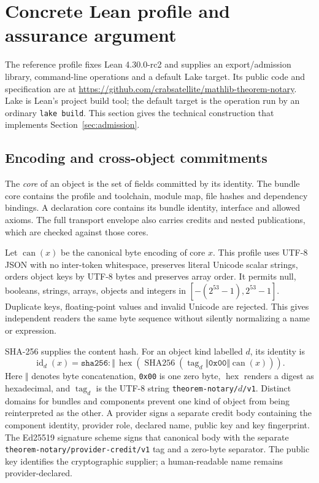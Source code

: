 \documentclass[11pt]{article}
\begin{document}
\section{Concrete Lean profile and assurance argument}
\label{sec:lean}

The reference profile fixes Lean 4.30.0-rc2 and supplies an export/admission
library, command-line operations and a default Lake target. Its public code and
specification are at \url{https://github.com/crabsatellite/mathlib-theorem-notary}.
Lake is Lean's
project build tool; the default target is the operation run by an ordinary
\texttt{lake build}. This section gives
the technical construction that implements Section~\ref{sec:admission}.

\subsection{Encoding and cross-object commitments}

The \emph{core} of an object is the set of fields committed by its identity.
The bundle core contains the profile and toolchain, module map, file hashes
and dependency bindings. A declaration core contains its bundle identity,
interface and allowed axioms. The full transport envelope also carries credits
and nested publications, which are checked against those cores.

Let $\operatorname{can}(x)$ be the canonical byte encoding of core $x$.
This profile uses UTF-8 JSON with no inter-token whitespace, preserves literal Unicode
scalar strings, orders object keys by UTF-8 bytes and preserves array order.
It permits null, booleans, strings, arrays, objects and integers in
$[-(2^{53}-1),2^{53}-1]$. Duplicate keys, floating-point values and invalid
Unicode are rejected. This gives independent readers the same byte sequence
without silently normalizing a name or expression.

SHA-256 supplies the content hash. For an object kind labelled $d$, its identity is
\[
\operatorname{id}_{d}(x)=\texttt{sha256:}\,\Vert\,
\operatorname{hex}\!\left(\operatorname{SHA256}
  (\operatorname{tag}_{d}\Vert\texttt{0x00}\Vert\operatorname{can}(x))\right).
\]
Here $\Vert$ denotes byte concatenation, \texttt{0x00} is one zero byte,
$\operatorname{hex}$ renders a digest
as hexadecimal, and $\operatorname{tag}_{d}$ is the UTF-8 string
\texttt{theorem-notary/}$d$\texttt{/v1}. Distinct domains for bundles and
components prevent one kind of object from being reinterpreted as the other.
A provider signs a separate credit body containing the component identity,
provider role, declared name, public key and key fingerprint. The Ed25519
signature scheme signs that canonical body with the separate
\texttt{theorem-notary/provider-credit/v1} tag and a zero-byte separator.
The public key identifies the cryptographic supplier; a human-readable name
remains provider-declared.
\end{document}
